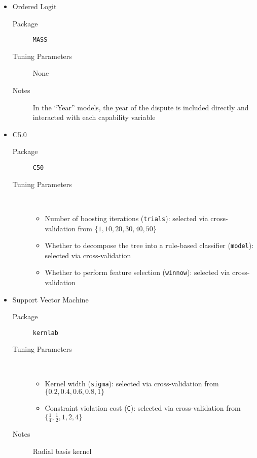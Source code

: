 \begin{itemize}
  \sloppy

  \item Ordered Logit 
  \begin{description}
    \item[Package] \texttt{MASS} 
    \item[Tuning Parameters] None
    \item[Notes] In the ``Year'' models, the year of the dispute is included directly and interacted with each capability variable
  \end{description}

  \item C5.0 
  \begin{description}
    \item[Package] \texttt{C50} 
    \item[Tuning Parameters] ~
    \begin{itemize}
      \item Number of boosting iterations (\texttt{trials}): selected via cross-validation from $\{1, 10, 20, 30, 40, 50\}$
      \item Whether to decompose the tree into a rule-based classifier (\texttt{model}): selected via cross-validation
      \item Whether to perform feature selection (\texttt{winnow}): selected via cross-validation
    \end{itemize}
  \end{description}

  \item Support Vector Machine 
  \begin{description}
    \item[Package] \texttt{kernlab} 
    \item[Tuning Parameters] ~
    \begin{itemize}
      \item Kernel width (\texttt{sigma}): selected via cross-validation from $\{0.2, 0.4, 0.6, 0.8, 1\}$
      \item Constraint violation cost (\texttt{C}): selected via cross-validation from $\{\frac{1}{4}, \frac{1}{2}, 1, 2, 4\}$
    \end{itemize}
    \item[Notes] Radial basis kernel
  \end{description}


\end{itemize}
